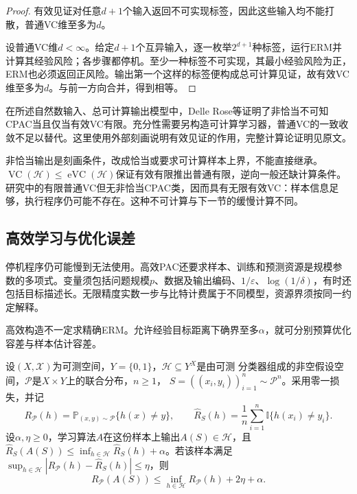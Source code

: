 \begin{proof}
有效见证对任意$d+1$个输入返回不可实现标签，因此这些输入均不能打散，普通VC维至多为$d$。

设普通VC维$d<\infty$。给定$d+1$个互异输入，逐一枚举$2^{d+1}$种标签，运行ERM并计算其经验风险；各步骤都停机。至少一种标签不可实现，其最小经验风险为正，ERM也必须返回正风险。输出第一个这样的标签便构成总可计算见证，故有效VC维至多为$d$。与前一方向合并，得到相等。
\end{proof}

在所述自然数输入、总可计算输出模型中，Delle Rose等证明了非恰当不可知CPAC当且仅当有效VC有限。充分性需要另构造可计算学习器，普通VC的一致收敛不足以替代。这里使用外部刻画说明有效见证的作用，完整计算论证明见原文。

非恰当输出是刻画条件，改成恰当或要求可计算样本上界，不能直接继承。$\operatorname{VC}(\mathcal H)\leq\operatorname{eVC}(\mathcal H)$保证有效有限推出普通有限，逆向一般还缺计算条件。研究中的有限普通VC但无非恰当CPAC类，因而具有无限有效VC：样本信息足够，执行程序仍可能不存在。这种不可计算与下一节的缓慢计算不同。

\subsection{高效学习与优化误差}

停机程序仍可能慢到无法使用。高效PAC还要求样本、训练和预测资源是规模参数的多项式。变量须包括问题规模$p$、数据及输出编码、$1/\varepsilon$、$\log(1/\delta)$，有时还包括目标描述长。无限精度实数一步与比特计费属于不同模型，资源界须按同一约定解释。

高效构造不一定求精确ERM。允许经验目标距离下确界至多$\alpha$，就可分别预算优化容差与样本估计容差。

\begin{theorem}[近似ERM的期望风险保证]
\label{thm:approximate-erm-risk}
设$(X,\mathcal X)$为可测空间，$Y=\{0,1\}$，$\mathcal H\subseteq Y^X$是由可测
分类器组成的非空假设空间，$\mathcal P$是$X\times Y$上的联合分布，$n\geq1$，
$S=((x_i,y_i))_{i=1}^n\sim\mathcal P^n$。采用零一损失，并记
\[
 R_{\mathcal P}(h)=\mathbb P_{(x,y)\sim\mathcal P}\{h(x)\neq y\},\qquad
 \hat R_S(h)=\frac1n\sum_{i=1}^n\mathbb I\{h(x_i)\neq y_i\}.
\]
设$\alpha,\eta\geq0$，学习算法$A$在这份样本上输出$A(S)\in\mathcal H$，且
$\hat R_S(A(S))\leq\inf_{h\in\mathcal H}\hat R_S(h)+\alpha$。若该样本满足
$\sup_{h\in\mathcal H}|R_{\mathcal P}(h)-\hat R_S(h)|\leq\eta$，则
\[
 R_{\mathcal P}(A(S))
 \leq\inf_{h\in\mathcal H}R_{\mathcal P}(h)+2\eta+\alpha.
\]
\end{theorem}

